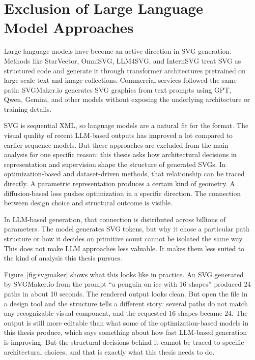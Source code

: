 \chapter{Exclusion of Large Language Model Approaches}
\label{app:llm_exclusion}

Large language models have become an active direction in 
SVG generation. Methods like StarVector, OmniSVG, LLM4SVG, 
and InternSVG treat SVG as structured code and generate it 
through transformer architectures pretrained on large-scale 
text and image collections. Commercial services followed the 
same path: SVGMaker.io generates SVG graphics from text 
prompts using GPT, Qwen, Gemini, and other models without 
exposing the underlying architecture or training details.

SVG is sequential XML, so language models are a natural fit 
for the format. The visual quality of recent LLM-based 
outputs has improved a lot compared to earlier sequence 
models. But these approaches are excluded from the main 
analysis for one specific reason: this thesis asks how 
architectural decisions in representation and supervision 
shape the structure of generated SVGs. In optimization-based 
and dataset-driven methods, that relationship can be traced 
directly. A parametric representation produces a certain 
kind of geometry. A diffusion-based loss pushes optimization 
in a specific direction. The connection between design 
choice and structural outcome is visible.

In LLM-based generation, that connection is distributed 
across billions of parameters. The model generates SVG 
tokens, but why it chose a particular path structure or 
how it decides on primitive count cannot be isolated the 
same way. This does not make LLM approaches less valuable. 
It makes them less suited to the kind of analysis this 
thesis pursues.

Figure~\ref{fig:svgmaker} shows what this looks like in 
practice. An SVG generated by SVGMaker.io from the prompt 
``a penguin on ice with 16 shapes'' produced 24 paths in 
about 10 seconds. The rendered output looks clean. But 
open the file in a design tool and the structure tells a 
different story: several paths do not match any recognizable 
visual component, and the requested 16 shapes became 24. 
The output is still more editable than what some of the 
optimization-based models in this thesis produce, which 
says something about how fast LLM-based generation is 
improving. But the structural decisions behind it cannot 
be traced to specific architectural choices, and that is 
exactly what this thesis needs to do.

